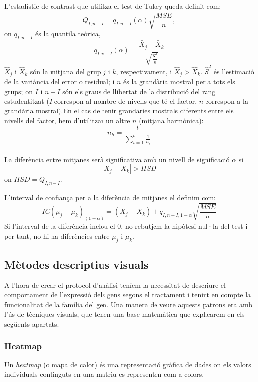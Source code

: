 \documentclass[english]{article}
\begin{document}
L'estadístic de contrast que utilitza el test de Tukey queda definit com:
\begin{equation*}
Q_{I,n-I} = q_{I,n-I}(\alpha)\sqrt{\frac{MSE}{n}} ,
\end{equation*}
on $q_{I,n-I}$ és la quantila teòrica,
\begin{equation*}
q_{I,n-I}(\alpha) = \frac{\bar{X}_j - \bar{X}_k}{\sqrt{\frac{\hat{S}^2}{n}}}
\end{equation*}
$\hat{X}_j$ i $\hat{X}_k$ són la mitjana del grup $j$ i $k$, respectivament, i $\hat{X}_j > \hat{X}_k$. $\hat{S}^2$ és l'estimació de la variància del error o residual; i $n$ és la grandària mostral per a tots els grups; on $I$ i $n-I$ són els graus de llibertat de la distribució del rang estudentitzat ($I$ correspon al nombre de nivells que té el factor, $n$ correspon a la grandària mostral).En el cas de tenir grandàries mostrals diferents entre els nivells del factor, hem d'utilitzar un altre $n$ (mitjana harmònica):
\begin{equation*}
n_h = \frac{t}{\sum_{i=1}^{t}\frac{1}{n_i}}
\end{equation*}
\\

La diferència entre mitjanes serà significativa amb un nivell de significació $\alpha$ si
\begin{equation*}
|\bar{X}_j - \bar{X}_k |> HSD
\end{equation*}
on $HSD=Q_{I,n-I}$.

L'interval de confian\c{c}a per a la diferència de mitjanes el definim com:
\begin{equation*}
IC(\mu_j - \mu_k)_{(1-\alpha)}= (\bar{X}_j - \bar{X}_k) \pm q_{I,n-I,1-\alpha}\sqrt{\frac{MSE}{n}}
\end{equation*}
Si l'interval de la diferència inclou el 0, no rebutjem la hipòtesi nul·la del test i per tant, no hi ha diferències entre $\mu_j$ i $\mu_k$.
\subsection{Mètodes descriptius visuals}
A l'hora de crear el protocol d'anàlisi teníem la necessitat de descriure el comportament de l'expressió dels gens segons el tractament i tenint en compte la funcionalitat de la família del gen. Una manera de veure aquests patrons era amb l'ús de tècniques visuals, que tenen una base matemàtica que explicarem en els següents apartats.
\subsubsection{Heatmap}
Un \textit{heatmap} (o mapa de calor) és una representació gràfica de dades on els valors individuals continguts en una matriu es representen com a colors.
\\
\end{document}
